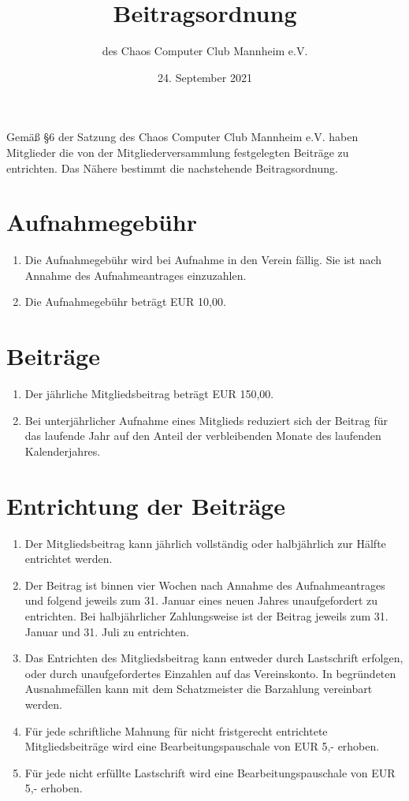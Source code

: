 \documentclass[a4paper, 12pt]{scrartcl}
\title{Beitragsordnung}
\subtitle{des Chaos Computer Club Mannheim e.V.}
\date{24. September 2021}
\begin{document}
\maketitle
\sffamily
\noindent Gemäß §6 der Satzung des Chaos Computer Club Mannheim e.V. haben Mitglieder die von der Mitgliederversammlung festgelegten Beiträge zu entrichten. Das Nähere bestimmt die nachstehende Beitragsordnung.

\section{Aufnahmegebühr}
	\begin{enumerate}
		\item Die Aufnahmegebühr wird bei Aufnahme in den Verein fällig. Sie ist nach Annahme des Aufnahmeantrages einzuzahlen.
		\item Die Aufnahmegebühr beträgt EUR 10,00.
	\end{enumerate}

\section{Beiträge}
	\begin{enumerate}
		\item Der jährliche Mitgliedsbeitrag beträgt EUR 150,00.
		\item Bei unterjährlicher Aufnahme eines Mitglieds reduziert sich der Beitrag für das laufende Jahr auf den Anteil der verbleibenden Monate des laufenden Kalenderjahres.
	\end{enumerate}

\section{Entrichtung der Beiträge}
	\begin{enumerate}
		\item Der Mitgliedsbeitrag kann jährlich vollständig oder halbjährlich zur Hälfte entrichtet werden.
		\item Der Beitrag ist binnen vier Wochen nach Annahme des Aufnahmeantrages und folgend jeweils zum 31. Januar eines neuen Jahres unaufgefordert zu entrichten. Bei halbjährlicher Zahlungsweise ist der Beitrag jeweils zum 31. Januar und 31. Juli zu entrichten.
		\item Das Entrichten des Mitgliedsbeitrag kann entweder durch Lastschrift erfolgen, oder durch unaufgefordertes Einzahlen auf das Vereinskonto. In begründeten Ausnahmefällen kann mit dem Schatzmeister die Barzahlung vereinbart werden.
		\item Für jede schriftliche Mahnung für nicht fristgerecht entrichtete Mitgliedsbeiträge wird eine Bearbeitungspauschale von EUR 5,- erhoben.
		\item Für jede nicht erfüllte Lastschrift wird eine Bearbeitungspauschale von EUR 5,- erhoben.
	\end{enumerate}
\end{document}

